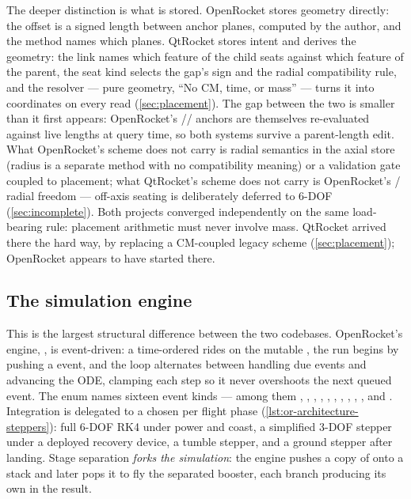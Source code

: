 The deeper distinction is what is stored. OpenRocket stores geometry directly: the offset
is a signed length between anchor planes, computed by the author, and the method names
which planes. QtRocket stores intent and derives the geometry: the link names which feature
of the child seats against which feature of the parent, the seat kind selects the gap's
sign and the radial compatibility rule, and the resolver --- pure geometry, ``No CM, time, or
mass''  --- turns it into coordinates on
every read (\cref{sec:placement}). The gap between the two is smaller than it first appears:
OpenRocket's // anchors are themselves re-evaluated
against live lengths at query time, so both systems survive a parent-length edit. What
OpenRocket's scheme does not carry is radial semantics in the axial store (radius is a
separate method with no compatibility meaning) or a validation gate coupled to placement;
what QtRocket's scheme does not carry is OpenRocket's / radial
freedom --- off-axis seating is deliberately deferred to 6-DOF (\cref{sec:incomplete}).
Both projects converged independently on the same load-bearing rule: placement arithmetic
must never involve mass. QtRocket arrived there the hard way, by replacing a CM-coupled
legacy scheme (\cref{sec:placement}); OpenRocket appears to have started there.

\subsection{The simulation engine}\label{app:or-architecture-engine}

This is the largest structural difference between the two codebases. OpenRocket's engine,
, is event-driven: a time-ordered  rides
on the mutable , the run begins by pushing a  event, and
the loop alternates between handling due events and advancing the ODE, clamping each step so
it never overshoots the next queued event. The  enum names sixteen
event kinds --- among them , , ,
, , , ,
, , , and
. Integration is delegated to a  chosen per
flight phase (\cref{lst:or-architecture-steppers}): full 6-DOF RK4 under power and coast, a
simplified 3-DOF stepper under a deployed recovery device, a tumble stepper, and a ground
stepper after landing. Stage separation \emph{forks the simulation}: the engine pushes a
copy of  onto a  stack and later pops it to fly the
separated booster, each branch producing its own  in the result.

